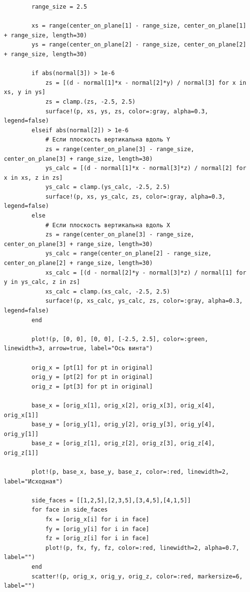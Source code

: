 \begin{verbatim}
        range_size = 2.5
        
        xs = range(center_on_plane[1] - range_size, center_on_plane[1] + range_size, length=30)
        ys = range(center_on_plane[2] - range_size, center_on_plane[2] + range_size, length=30)

        if abs(normal[3]) > 1e-6
            zs = [(d - normal[1]*x - normal[2]*y) / normal[3] for x in xs, y in ys]
            zs = clamp.(zs, -2.5, 2.5)
            surface!(p, xs, ys, zs, color=:gray, alpha=0.3, legend=false)
        elseif abs(normal[2]) > 1e-6
            # Если плоскость вертикальна вдоль Y
            zs = range(center_on_plane[3] - range_size, center_on_plane[3] + range_size, length=30)
            ys_calc = [(d - normal[1]*x - normal[3]*z) / normal[2] for x in xs, z in zs]
            ys_calc = clamp.(ys_calc, -2.5, 2.5)
            surface!(p, xs, ys_calc, zs, color=:gray, alpha=0.3, legend=false)
        else
            # Если плоскость вертикальна вдоль X
            zs = range(center_on_plane[3] - range_size, center_on_plane[3] + range_size, length=30)
            ys_calc = range(center_on_plane[2] - range_size, center_on_plane[2] + range_size, length=30)
            xs_calc = [(d - normal[2]*y - normal[3]*z) / normal[1] for y in ys_calc, z in zs]
            xs_calc = clamp.(xs_calc, -2.5, 2.5)
            surface!(p, xs_calc, ys_calc, zs, color=:gray, alpha=0.3, legend=false)
        end

        plot!(p, [0, 0], [0, 0], [-2.5, 2.5], color=:green, linewidth=3, arrow=true, label="Ось винта")

        orig_x = [pt[1] for pt in original]
        orig_y = [pt[2] for pt in original]
        orig_z = [pt[3] for pt in original]
        
        base_x = [orig_x[1], orig_x[2], orig_x[3], orig_x[4], orig_x[1]]
        base_y = [orig_y[1], orig_y[2], orig_y[3], orig_y[4], orig_y[1]]
        base_z = [orig_z[1], orig_z[2], orig_z[3], orig_z[4], orig_z[1]]
        
        plot!(p, base_x, base_y, base_z, color=:red, linewidth=2, label="Исходная")
        
        side_faces = [[1,2,5],[2,3,5],[3,4,5],[4,1,5]]
        for face in side_faces
            fx = [orig_x[i] for i in face]
            fy = [orig_y[i] for i in face]
            fz = [orig_z[i] for i in face]
            plot!(p, fx, fy, fz, color=:red, linewidth=2, alpha=0.7, label="")
        end
        scatter!(p, orig_x, orig_y, orig_z, color=:red, markersize=6, label="")


\end{verbatim}
